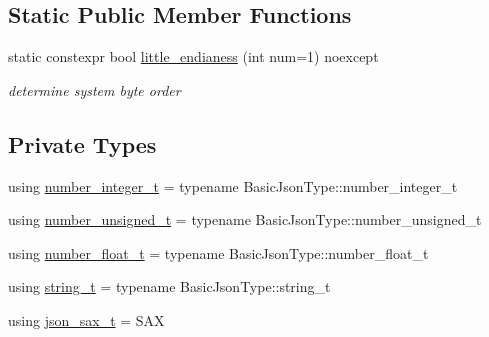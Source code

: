 \subsection*{Static Public Member Functions}
\begin{DoxyCompactItemize}
\item 
static constexpr bool \hyperlink{classnlohmann_1_1detail_1_1binary__reader_a1e31dbfcf9567c8c2d4f0e4eb1b0230a}{little\+\_\+endianess} (int num=1) noexcept
\begin{DoxyCompactList}\small\item\em determine system byte order \end{DoxyCompactList}\end{DoxyCompactItemize}
\subsection*{Private Types}
\begin{DoxyCompactItemize}
\item 
using \hyperlink{classnlohmann_1_1detail_1_1binary__reader_aa093d9bce6c6ec715a049f2a26d7c4d5}{number\+\_\+integer\+\_\+t} = typename Basic\+Json\+Type\+::number\+\_\+integer\+\_\+t
\item 
using \hyperlink{classnlohmann_1_1detail_1_1binary__reader_a13bb5e2014c4cdf013d8715157cb456e}{number\+\_\+unsigned\+\_\+t} = typename Basic\+Json\+Type\+::number\+\_\+unsigned\+\_\+t
\item 
using \hyperlink{classnlohmann_1_1detail_1_1binary__reader_af4488e5400da86636fd2f4d0171bbf53}{number\+\_\+float\+\_\+t} = typename Basic\+Json\+Type\+::number\+\_\+float\+\_\+t
\item 
using \hyperlink{classnlohmann_1_1detail_1_1binary__reader_aa0b9729917ca7ee6ed01e3792341316e}{string\+\_\+t} = typename Basic\+Json\+Type\+::string\+\_\+t
\item 
using \hyperlink{classnlohmann_1_1detail_1_1binary__reader_a43c5dc6a3219f64a7824d7ba9c7b14ae}{json\+\_\+sax\+\_\+t} = S\+AX
\end{DoxyCompactItemize}
